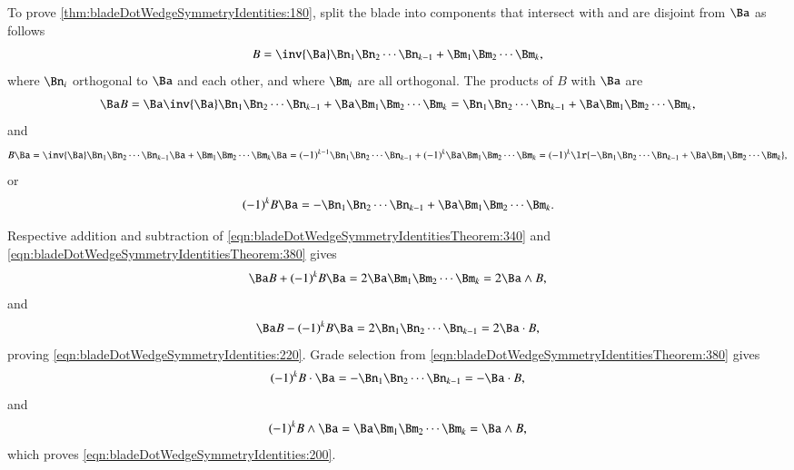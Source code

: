To prove \cref{thm:bladeDotWedgeSymmetryIdentities:180}, split the blade into components that intersect with and are disjoint from \( \Ba \) as follows
\begin{dmath}\label{eqn:bladeDotWedgeSymmetryIdentitiesTheorem:240}
B
=
\inv{\Ba} \Bn_1 \Bn_2 \cdots \Bn_{k-1} + \Bm_1 \Bm_2 \cdots \Bm_k,
\end{dmath}
where \( \Bn_i \) orthogonal to \( \Ba \) and each other, and where \( \Bm_i \) are all orthogonal.  The products of \( B \) with \( \Ba \) are
\begin{dmath}\label{eqn:bladeDotWedgeSymmetryIdentitiesTheorem:340}
\Ba B
=
\Ba \inv{\Ba} \Bn_1 \Bn_2 \cdots \Bn_{k-1} + \Ba \Bm_1 \Bm_2 \cdots \Bm_k
=
\Bn_1 \Bn_2 \cdots \Bn_{k-1} + \Ba \Bm_1 \Bm_2 \cdots \Bm_k,
\end{dmath}
and
\begin{dmath}\label{eqn:bladeDotWedgeSymmetryIdentitiesTheorem:360}
B \Ba
=
\inv{\Ba} \Bn_1 \Bn_2 \cdots \Bn_{k-1} \Ba + \Bm_1 \Bm_2 \cdots \Bm_k \Ba
=
(-1)^{k-1} \Bn_1 \Bn_2 \cdots \Bn_{k-1} + (-1)^k \Ba \Bm_1 \Bm_2 \cdots \Bm_k
=
(-1)^k \lr{ - \Bn_1 \Bn_2 \cdots \Bn_{k-1} + \Ba \Bm_1 \Bm_2 \cdots \Bm_k },
\end{dmath}
or
\begin{dmath}\label{eqn:bladeDotWedgeSymmetryIdentitiesTheorem:380}
(-1)^k B \Ba
=
- \Bn_1 \Bn_2 \cdots \Bn_{k-1} + \Ba \Bm_1 \Bm_2 \cdots \Bm_k.
\end{dmath}

Respective addition and subtraction of \cref{eqn:bladeDotWedgeSymmetryIdentitiesTheorem:340} and \cref{eqn:bladeDotWedgeSymmetryIdentitiesTheorem:380} gives
\begin{dmath}\label{eqn:bladeDotWedgeSymmetryIdentitiesTheorem:400}
\Ba B + (-1)^k B \Ba
= 2 \Ba \Bm_1 \Bm_2 \cdots \Bm_k
= 2 \Ba \wedge B,
\end{dmath}
and
\begin{dmath}\label{eqn:bladeDotWedgeSymmetryIdentitiesTheorem:420}
\Ba B - (-1)^k B \Ba
=
2
\Bn_1 \Bn_2 \cdots \Bn_{k-1}
= 2 \Ba \cdot B,
\end{dmath}
proving \cref{eqn:bladeDotWedgeSymmetryIdentities:220}.  Grade selection from \cref{eqn:bladeDotWedgeSymmetryIdentitiesTheorem:380} gives
\begin{dmath}\label{eqn:bladeDotWedgeSymmetryIdentitiesTheorem:440}
(-1)^k B \cdot \Ba
=
- \Bn_1 \Bn_2 \cdots \Bn_{k-1}
= - \Ba \cdot B,
\end{dmath}
and
\begin{dmath}\label{eqn:bladeDotWedgeSymmetryIdentitiesTheorem:460}
(-1)^k B \wedge \Ba
=
\Ba \Bm_1 \Bm_2 \cdots \Bm_k
= \Ba \wedge B,
\end{dmath}
which proves \cref{eqn:bladeDotWedgeSymmetryIdentities:200}.


